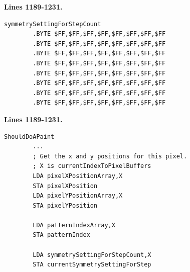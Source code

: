 \clearpage
\textbf{Lines 1189-1231. }
\begin{lstlisting}
symmetrySettingForStepCount
        .BYTE $FF,$FF,$FF,$FF,$FF,$FF,$FF,$FF
        .BYTE $FF,$FF,$FF,$FF,$FF,$FF,$FF,$FF
        .BYTE $FF,$FF,$FF,$FF,$FF,$FF,$FF,$FF
        .BYTE $FF,$FF,$FF,$FF,$FF,$FF,$FF,$FF
        .BYTE $FF,$FF,$FF,$FF,$FF,$FF,$FF,$FF
        .BYTE $FF,$FF,$FF,$FF,$FF,$FF,$FF,$FF
        .BYTE $FF,$FF,$FF,$FF,$FF,$FF,$FF,$FF
        .BYTE $FF,$FF,$FF,$FF,$FF,$FF,$FF,$FF
\end{lstlisting}
\textbf{Lines 1189-1231. }
\begin{lstlisting}
ShouldDoAPaint   
        ...
        ; Get the x and y positions for this pixel.
        ; X is currentIndexToPixelBuffers
        LDA pixelXPositionArray,X
        STA pixelXPosition
        LDA pixelYPositionArray,X
        STA pixelYPosition

        LDA patternIndexArray,X
        STA patternIndex

        LDA symmetrySettingForStepCount,X
        STA currentSymmetrySettingForStep
\end{lstlisting}
\vfill
